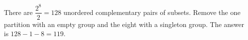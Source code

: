 There are $\dfrac{2^8}{2}=128$ unordered complementary pairs of subsets. Remove the one partition with an empty group and the eight with a singleton group. The answer is $128-1-8=\boxed{119}$.
